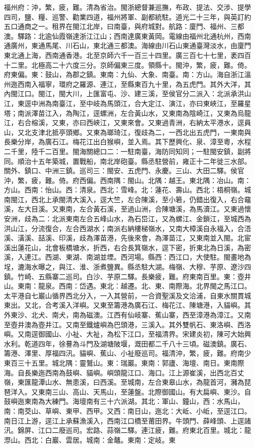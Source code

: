 \begin{pinyinscope}
福州府：沖，繁，疲，難。清為省治。閩浙總督兼巡撫，布政、提法、交涉、提學四司，鹽、糧、巡警、勸業四道，福州將軍、副都統駐。道光二十三年，與英訂約五口通商之一。租界在閩江北岸，曰南臺，與府城對。航路：廈門、福州、三都澳。驛路：北逾仙霞嶺達浙江江山；西南達廣東黃岡。電線由福州北通杭州，西南通廣州，東通馬尾、川石山，東北通三都澳。海線由川石山東通臺灣淡水，由廈門東北通上海，西南通香港。北至京師六千一百三十四里。廣三百七十七里，袤四百十二里。北極高二十六度三分。京師偏東三度。領縣十。閩沖，繁，疲，難。倚。府東偏。東：鼓山，為郡之鎮。東南：九仙、大象、南臺。南：方山。海自浙江溫州迤西南入福寧，環府之羅源、連江，至縣東百九十里，為五虎門。其外大洋，其內閩江口。閩江，閩大川，上匯富屯、沙、建三溪，至侯官分二派入：北派承洪山江，東逕中洲為南臺江，至中岐為馬頭江，合大定江、演江，亦曰東峽江，至羅星塔；南派澤苗江入，為陶江，逕螺洲，左合黃山水，又東南為陰崎江，又東為烏龍江，右合榕溪，又東，亦曰西峽江，又東來會。又東過青洲，右納太平港水，逕員山，又北支津北抵亭頭鄉。又東為瑯琦江，復歧為二，一西北出五虎門，一東南與長樂分岸，為廣石江。梅花江出白猴嶼，並入焉。其下歷興化、泉、漳至粵，水程二千里，陸千二百里。閩海關總口二：一駐南臺，海防同知同；一駐閩安鎮，副將同。順治十五年築城，置戰船，南北岸砲臺。縣丞駐營前，雍正十二年徙三水部。關外、鎮口、中洲三鎮。巡司三：閩安、五虎門、永慶。三山、大田二驛。侯官沖，繁，疲，難。倚。府西偏。西南隅：閩山。北隅：越王。東北隅：冶山。南：方山。西南：怡山。西：清泉。西北：雪峰。北：蓮花、壽山。西北：梧桐嶺。城南閩江，西北上承閩清大溪入，逕大竺，左合陳溪，至小箬，仍錯出復入，右合黿溪，左大目溪。又東南，左合黃石溪，至過山洲，合陳塘溪，為馬瀆江。又東過懷安洲，歧為二：北派東南左合五峰山水，為石岊江，又為螺江、金鎖江，至城西為洪山江，分流復合，左合西湖水；南派右納樓梯嶺水，又南大樟溪自永福入，合浯溪、潢溪、喆溪、印溪，歧為澤苗港，先後來會，為澤苗江，又東南並入閩。北宦溪出蓮花山，北會板橋塘水，折西，右合長箕嶺水，逕下密，折東北為日溪，為密溪，入連江。西湖、東湖、南湖並堙。西河場。縣西：西江口，大使駐。閩畫地為埕，漉海水曝之，與江、淮、浙煮鹽異。縣丞駐大湖。梅嶺、大穆、芋原、遼沙四鎮。竹崎、五縣寨二巡司。白沙、芋原二驛。長樂疲，難。府東南百里。東：壺井山。東南：龍泉。西南：岱遇。東北：越遷。北、東、南際海。北界閩之馬江口。太平港自七巖山循界西北分入，一入其營前，一合資聖溪及文洽浦，自東水關貫城東出。又北，合考溪入洋嶼。又東至籌港為廣石江、梅花江、陳塘港，入貓嶼。其外東沙、北犬、南犬，南為磁澳。江西有仙岐寨、蕉山寨，西至漳港為漳江。又南至壺井澳為壺井江。又南至鐵爐嶼為巴頭港，三溪入。其外雙帆石、東洛嶼、西洛嶼。又南逕御國山、小祉、大祉，為松下江口，至福清界。宋建炎初，陳可大始興水利。乾道四年，徐謩為斗門及湖塘陂堰，溉田都二千八十三頃。磁澳鎮。廣石、籌港、澤里、厚福四汛。貓嶼、蕉山、小祉廢巡司。福清沖，繁，疲，難。府南少東百三十五里。城北隅：靈鷲山。東：瑞巖。東南：郭廬、海壇、南日。東南際海。自長樂迤西南為鼓嶼、貓嶼。嶼頭龍江口、海口。江上源崔溪，出西北百丈嶺，東匯龍潭山水、無患溪，曰西溪。至城南，左合東皋山水，為龍首河，瀦為琵琶洋入。又東南三山、高山、天馬山，至蓮盤。北際御國山。有大扁嶼、東沙。自鼓嶼迤東南為大練門。海壇南有三十六派湖。其北：軍山、鐘山，西：水馬山，南：南茭山、草嶼、東甲、西甲。又西：南日山，迤北：大岴、小岴，至逕江口。南日江上游，逕江上承蘇漁溪入，西南江口橋至莆田界。牛頭門、薛峰頭、上逕諸汛。錦屏、江口二廢巡司。宏路、蒜嶺二驛。連江疲，難。府東北百里。城北：龍漈山。西北：白巖、雲居。城南：金鼇。東南：定岐。東
\end{pinyinscope}
